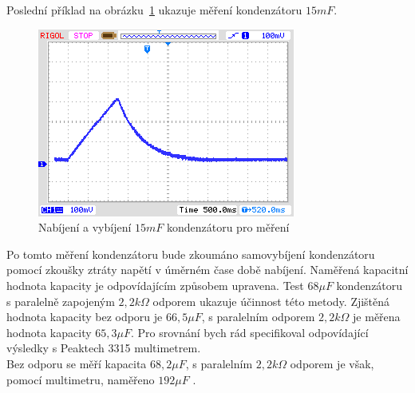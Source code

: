 Poslední příklad na obrázku~\ref{pic:c15mF} ukazuje měření kondenzátoru \(15mF\).
\begin{figure}[H]
  \centering
    \includegraphics[width=.8\textwidth]{../PNG/charge_15mF.png}
  \caption{Nabíjení a vybíjení \(15mF\) kondenzátoru pro měření}
  \label{pic:c15mF}
\end{figure}

Po tomto měření kondenzátoru bude zkoumáno samovybíjení kondenzátoru pomocí
zkoušky ztráty napětí v úměrném čase době nabíjení.
Naměřená kapacitní hodnota kapacity je odpovídajícím způsobem upravena.
Test \(68\mu F\) kondenzátoru s paralelně zapojeným \(2,2k\Omega\) odporem ukazuje účinnost této metody.
Zjištěná hodnota kapacity bez odporu
je \(66,5\mu F\), s paralelním odporem \(2,2k\Omega\) je měřena hodnota kapacity \(65,3\mu F\).
Pro srovnání bych rád specifikoval odpovídající výsledky s Peaktech 3315 multimetrem.\\
Bez odporu se měří kapacita \(68,2\mu F\), s paralelním \(2,2k\Omega\) odporem je však,
pomocí multimetru, naměřeno \(192\mu F\)  .


